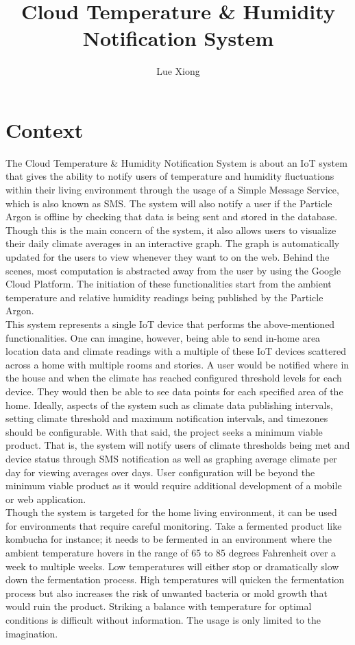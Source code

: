\documentclass{article}
\title{Cloud Temperature \& Humidity Notification System}
\author{Lue Xiong}
\begin{document}
\maketitle
\newpage

\tableofcontents
\newpage

\obeylines

\section{Context}
The Cloud Temperature \& Humidity Notification System is about an IoT system that gives the ability to notify users of temperature and humidity fluctuations within their living environment through the usage of a Simple Message Service, which is also known as SMS. The system will also notify a user if the Particle Argon is offline by checking that data is being sent and stored in the database. Though this is the main concern of the system, it also allows users to visualize their daily climate averages in an interactive graph. The graph is automatically updated for the users to view whenever they want to on the web. Behind the scenes, most computation is abstracted away from the user by using the Google Cloud Platform. The initiation of these functionalities start from the ambient temperature and relative humidity readings being published by the Particle Argon.\\

This system represents a single IoT device that performs the above-mentioned functionalities. One can imagine, however, being able to send in-home area location data and climate readings with a multiple of these IoT devices scattered across a home with multiple rooms and stories. A user would be notified where in the house and when the climate has reached configured threshold levels for each device. They would then be able to see data points for each specified area of the home. Ideally, aspects of the system such as climate data publishing intervals, setting climate threshold and maximum notification intervals, and timezones should be configurable. With that said, the project seeks a minimum viable product. That is, the system will notify users of climate thresholds being met and device status through SMS notification as well as graphing average climate per day for viewing averages over days. User configuration will be beyond the minimum viable product as it would require additional development of a mobile or web application.\\

Though the system is targeted for the home living environment, it can be used for environments that require careful monitoring. Take a fermented product like kombucha for instance; it needs to be fermented in an environment where the ambient temperature hovers in the range of 65 to 85 degrees Fahrenheit over a week to multiple weeks. Low temperatures will either stop or dramatically slow down the fermentation process. High temperatures will quicken the fermentation process but also increases the risk of unwanted bacteria or mold growth that would ruin the product. Striking a balance with temperature for optimal conditions is difficult without information. The usage is only limited to the imagination.\\
\end{document}
